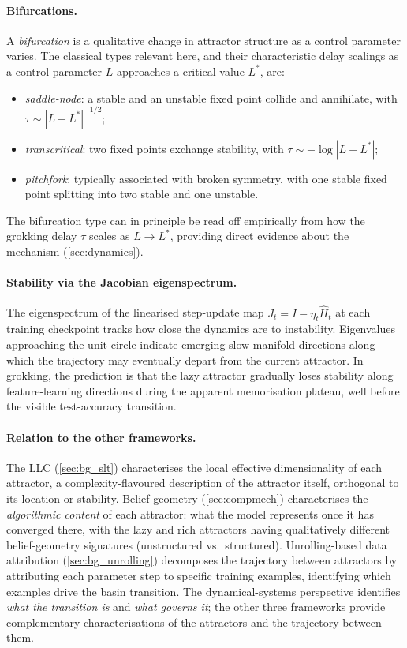 \documentclass[11pt,a4paper]{article}
\begin{document}
\paragraph{Bifurcations.} A \emph{bifurcation} is a qualitative change in attractor structure as a control parameter varies. The classical types relevant here, and their characteristic delay scalings as a control parameter $L$ approaches a critical value $L^*$, are:
\begin{itemize}
    \item \emph{saddle-node}: a stable and an unstable fixed point collide and annihilate, with $\tau \sim |L - L^*|^{-1/2}$;
    \item \emph{transcritical}: two fixed points exchange stability, with $\tau \sim -\log|L - L^*|$;
    \item \emph{pitchfork}: typically associated with broken symmetry, with one stable fixed point splitting into two stable and one unstable.
\end{itemize}
The bifurcation type can in principle be read off empirically from how the grokking delay $\tau$ scales as $L \to L^*$, providing direct evidence about the mechanism (\cref{sec:dynamics}).

\paragraph{Stability via the Jacobian eigenspectrum.} The eigenspectrum of the linearised step-update map $J_t = I - \eta_t \hat{H}_t$ at each training checkpoint tracks how close the dynamics are to instability. Eigenvalues approaching the unit circle indicate emerging slow-manifold directions along which the trajectory may eventually depart from the current attractor. In grokking, the prediction is that the lazy attractor gradually loses stability along feature-learning directions during the apparent memorisation plateau, well before the visible test-accuracy transition.

\paragraph{Relation to the other frameworks.} The LLC (\cref{sec:bg_slt}) characterises the local effective dimensionality of each attractor, a complexity-flavoured description of the attractor itself, orthogonal to its location or stability. Belief geometry (\cref{sec:compmech}) characterises the \emph{algorithmic content} of each attractor: what the model represents once it has converged there, with the lazy and rich attractors having qualitatively different belief-geometry signatures (unstructured vs.\ structured). Unrolling-based data attribution (\cref{sec:bg_unrolling}) decomposes the trajectory between attractors by attributing each parameter step to specific training examples, identifying which examples drive the basin transition. The dynamical-systems perspective identifies \emph{what the transition is} and \emph{what governs it}; the other three frameworks provide complementary characterisations of the attractors and the trajectory between them.
\end{document}
